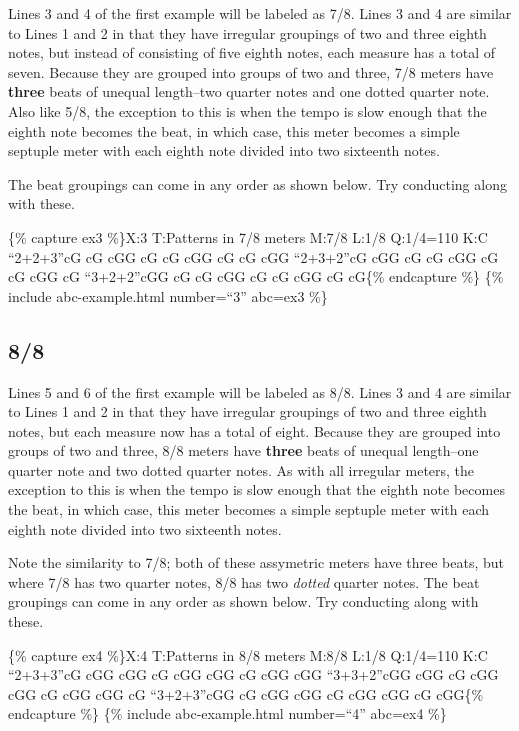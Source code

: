 \documentclass{book}
\begin{document}
Lines 3 and 4 of the first example will be labeled as 7/8. Lines 3 and 4 are
similar to Lines 1 and 2 in that they have irregular groupings of two and
three eighth notes, but instead of consisting of five eighth notes, each
measure has a total of seven. Because they are grouped into groups of two and
three, 7/8 meters have \textbf{three} beats of unequal length--two quarter
notes and one dotted quarter note. Also like 5/8, the exception to this is
when the tempo is slow enough that the eighth note becomes the beat, in which
case, this meter becomes a simple septuple meter with each eighth note divided
into two sixteenth notes.

The beat groupings can come in any order as shown below. Try conducting along
with these.

\{\% capture ex3 \%\}X:3 T:Patterns in 7/8 meters M:7/8 L:1/8 Q:1/4=110 K:C
``2+2+3''cG cG cGG\textbar{} cG cG cGG\textbar{} cG cG cGG\textbar{]}
``2+3+2''cG cGG cG\textbar{} cG cGG cG\textbar{} cG cGG cG\textbar{]}
``3+2+2''cGG cG cG\textbar{} cGG cG cG\textbar{} cGG cG cG\textbar{]}\{\%
endcapture \%\} \{\% include abc-example.html number=``3'' abc=ex3 \%\}

\hypertarget{section-2}{%
\subsection{8/8}\label{section-2}}

Lines 5 and 6 of the first example will be labeled as 8/8. Lines 3 and 4 are
similar to Lines 1 and 2 in that they have irregular groupings of two and
three eighth notes, but each measure now has a total of eight. Because they
are grouped into groups of two and three, 8/8 meters have \textbf{three} beats
of unequal length--one quarter note and two dotted quarter notes. As with all
irregular meters, the exception to this is when the tempo is slow enough that
the eighth note becomes the beat, in which case, this meter becomes a simple
septuple meter with each eighth note divided into two sixteenth notes.

Note the similarity to 7/8; both of these assymetric meters have three beats,
but where 7/8 has two quarter notes, 8/8 has two \emph{dotted} quarter notes.
The beat groupings can come in any order as shown below. Try conducting along
with these.

\{\% capture ex4 \%\}X:4 T:Patterns in 8/8 meters M:8/8 L:1/8 Q:1/4=110 K:C
``2+3+3''cG cGG cGG\textbar{} cG cGG cGG\textbar{} cG cGG cGG\textbar{]}
``3+3+2''cGG cGG cG\textbar{} cGG cGG cG\textbar{} cGG cGG cG\textbar{]}
``3+2+3''cGG cG cGG\textbar{} cGG cG cGG\textbar{} cGG cG cGG\textbar{]}\{\%
endcapture \%\} \{\% include abc-example.html number=``4'' abc=ex4 \%\}
\end{document}
